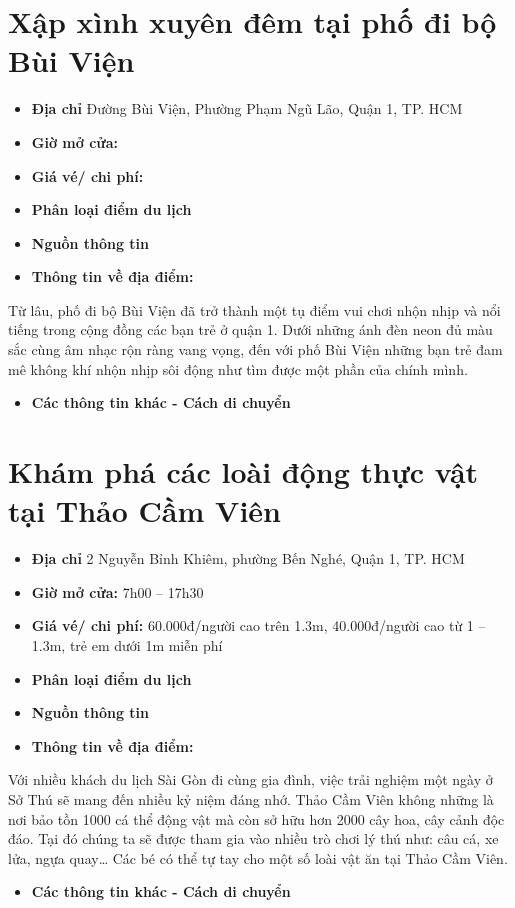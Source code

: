 \documentclass{article}
\begin{document}
\section{Xập xình xuyên đêm tại phố đi bộ Bùi Viện}
\begin{itemize}
    \item{\textbf{Địa chỉ}} Đường Bùi Viện, Phường Phạm Ngũ Lão, Quận 1, TP. HCM
    \item{\textbf{Giờ mở cửa:}}
    \item{\textbf{Giá vé/ chi phí:}}
    \item{\textbf{Phân loại điểm du lịch} }
    \item{\textbf{Nguồn thông tin}}
    \item{\textbf{Thông tin về địa điểm:}}
\end{itemize}
Từ lâu, phố đi bộ Bùi Viện đã trở thành một tụ điểm vui chơi nhộn nhịp và nổi tiếng trong cộng đồng các bạn trẻ ở quận 1. Dưới những ánh đèn neon đủ màu sắc cùng âm nhạc rộn ràng vang vọng, đến với phố Bùi Viện những bạn trẻ đam mê không khí nhộn nhịp sôi động như tìm được một phần của chính mình.
\begin{itemize}
    \item{\textbf{Các thông tin khác - Cách di chuyển}}
\end{itemize}

\section{Khám phá các loài động thực vật tại Thảo Cầm Viên}
\begin{itemize}
    \item{\textbf{Địa chỉ}} 2 Nguyễn Bỉnh Khiêm, phường Bến Nghé, Quận 1, TP. HCM
    \item{\textbf{Giờ mở cửa:}} 7h00 – 17h30
    \item{\textbf{Giá vé/ chi phí:}} 60.000đ/người cao trên 1.3m, 40.000đ/người cao từ 1 – 1.3m, trẻ em dưới 1m miễn phí
    \item{\textbf{Phân loại điểm du lịch} }
    \item{\textbf{Nguồn thông tin}}
    \item{\textbf{Thông tin về địa điểm:}}
\end{itemize}
Với nhiều khách du lịch Sài Gòn đi cùng gia đình, việc trải nghiệm một ngày ở Sở Thú sẽ mang đến nhiều kỷ niệm đáng nhớ. Thảo Cầm Viên không những là nơi bảo tồn 1000 cá thể động vật mà còn sở hữu hơn 2000 cây hoa, cây cảnh độc đáo. Tại đó chúng ta sẽ được tham gia vào nhiều trò chơi lý thú như: câu cá, xe lửa, ngựa quay… Các bé có thể tự tay cho một số loài vật ăn tại Thảo Cầm Viên.
\begin{itemize}
    \item{\textbf{Các thông tin khác - Cách di chuyển}}
\end{itemize}
\end{document}
